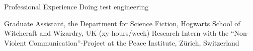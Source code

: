 \begin{rubric}{Professional Experience} %
Doing test engineering

Graduate Assistant, the Department for Science Fiction, Hogwarts School of Witchcraft and Wizardry, UK (xy hours/week) 
\entry*[MM/YY --- MM/YY]
Research Intern with the ``Non-Violent Communication''-Project at the Peace Institute, Z\"urich, Switzerland
\end{rubric}